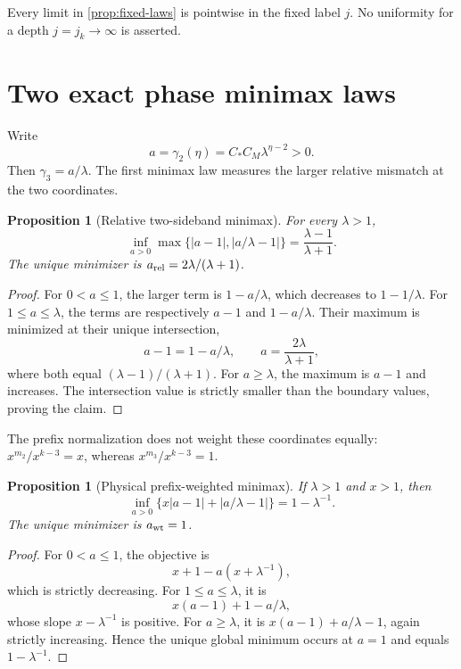 \documentclass[11pt]{article}
\newtheorem{proposition}[theorem]{Proposition}
\theoremstyle{remark}
\begin{document}
Every limit in \cref{prop:fixed-laws} is pointwise in the fixed label $j$.
No uniformity for a depth $j=j_k\to\infty$ is asserted.

\section{Two exact phase minimax laws}

Write
\begin{equation}\label{eq:a}
 a=\gamma_2(\eta)=C_*C_M\lambda^{\eta-2}>0.
\end{equation}
Then $\gamma_3=a/\lambda$.  The first minimax law measures the larger
relative mismatch at the two coordinates.

\begin{proposition}[Relative two-sideband minimax]
\label{prop:relative-minimax}
For every $\lambda>1$,
\begin{equation}\label{eq:relative-minimax}
 \boxed{
 \inf_{a>0}\max\{|a-1|,|a/\lambda-1|\}
 =\frac{\lambda-1}{\lambda+1}.}
\end{equation}
The unique minimizer is
$a_{\rm rel}=2\lambda/(\lambda+1)$.
\end{proposition}

\begin{proof}
For $0<a\le1$, the larger term is $1-a/\lambda$, which decreases to
$1-1/\lambda$.  For $1\le a\le\lambda$, the terms are respectively
$a-1$ and $1-a/\lambda$.  Their maximum is minimized at their unique
intersection,
\[
 a-1=1-a/\lambda,\qquad
 a=\frac{2\lambda}{\lambda+1},
\]
where both equal $(\lambda-1)/(\lambda+1)$.  For $a\ge\lambda$, the
maximum is $a-1$ and increases.  The intersection value is strictly smaller
than the boundary values, proving the claim.
\end{proof}

The prefix normalization does not weight these coordinates equally:
$x^{m_2}/x^{k-3}=x$, whereas $x^{m_3}/x^{k-3}=1$.

\begin{proposition}[Physical prefix-weighted minimax]
\label{prop:weighted-minimax}
If $\lambda>1$ and $x>1$, then
\begin{equation}\label{eq:weighted-minimax}
 \boxed{
 \inf_{a>0}\{x|a-1|+|a/\lambda-1|\}
 =1-\lambda^{-1}.}
\end{equation}
The unique minimizer is $a_{\rm wt}=1$.
\end{proposition}

\begin{proof}
For $0<a\le1$, the objective is
\[
 x+1-a(x+\lambda^{-1}),
\]
which is strictly decreasing.  For $1\le a\le\lambda$, it is
\[
 x(a-1)+1-a/\lambda,
\]
whose slope $x-\lambda^{-1}$ is positive.  For $a\ge\lambda$, it is
$x(a-1)+a/\lambda-1$, again strictly increasing.  Hence the unique global
minimum occurs at $a=1$ and equals $1-\lambda^{-1}$.
\end{proof}
\end{document}
